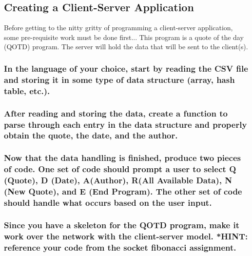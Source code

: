 \documentclass{article}
\begin{document}
	\begin{Large}
		\subsection{\textbf{Creating a Client-Server Application}}
	\end{Large}
	
	Before getting to the nitty gritty of programming a client-server application, some pre-requisite work must be done first...
	\linebreak
	\linebreak
	This program is a quote of the day (QOTD) program. The server will hold the data that will be sent to the client(s). 
	
	\subsubsection{In the language of your choice, start by reading the CSV file and storing it in some type of data structure (array, hash table, etc.).}
	\vspace{24pt}
	\subsubsection{After reading and storing the data, create a function to parse through each entry in the data structure and properly obtain the quote, the date, and the author.}
	\vspace{24pt}
	\subsubsection{Now that the data handling is finished, produce two pieces of code. One set of code should prompt a user to select Q (Quote), D (Date), A(Author), R(All Available Data), N (New Quote), and E (End Program). The other set of code should handle what occurs based on the user input.}
	\vspace{24pt}
	\subsubsection{Since you have a skeleton for the QOTD program, make it work over the network with the client-server model. *HINT: reference your code from the socket fibonacci assignment.}
\end{document}
